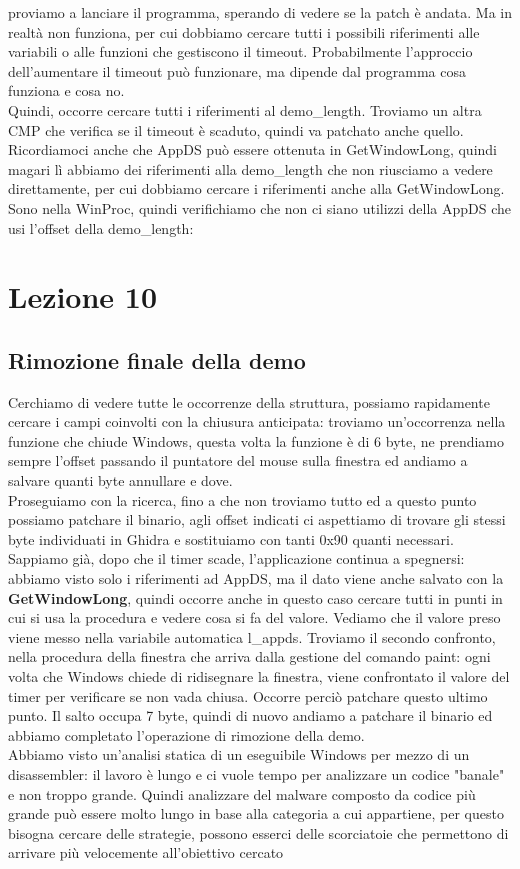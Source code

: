 \documentclass[12pt, oneside]{extbook}
\begin{document}
proviamo a lanciare il  programma, sperando di vedere se la patch è andata. Ma in realtà non funziona, per cui dobbiamo cercare tutti i possibili riferimenti alle variabili o alle funzioni che gestiscono il timeout. Probabilmente l'approccio dell'aumentare il timeout può funzionare, ma dipende dal programma cosa funziona e cosa no.\\ Quindi, occorre cercare tutti i riferimenti al \textsf{demo\_length}. Troviamo un altra CMP che verifica se il timeout è scaduto, quindi va patchato anche quello.\\ Ricordiamoci anche che AppDS può essere ottenuta in GetWindowLong, quindi magari lì abbiamo dei riferimenti alla \textsf{demo\_length} che non riusciamo a vedere direttamente, per cui dobbiamo cercare i riferimenti anche alla GetWindowLong. Sono nella WinProc, quindi verifichiamo che non ci siano utilizzi della AppDS che usi l'offset della \textsf{demo\_length}: 
\chapter{Lezione 10}
\section{Rimozione finale della demo}
Cerchiamo di vedere tutte le occorrenze della struttura, possiamo rapidamente cercare i campi coinvolti con la chiusura anticipata: troviamo un'occorrenza nella funzione che chiude Windows, questa volta la funzione è di 6 byte, ne prendiamo sempre l'offset passando il puntatore del mouse sulla finestra ed andiamo a salvare quanti byte annullare e dove.\\ Proseguiamo con la ricerca, fino a che non troviamo tutto ed a questo punto possiamo patchare il binario, agli offset indicati ci aspettiamo di trovare gli stessi byte individuati in Ghidra e sostituiamo con tanti 0x90 quanti necessari. Sappiamo già, dopo che il timer scade, l'applicazione continua a spegnersi: abbiamo visto solo i riferimenti ad AppDS, ma il dato viene anche salvato con la \textbf{GetWindowLong}, quindi occorre anche in questo caso cercare tutti in punti in cui si usa la procedura e vedere cosa si fa del valore. Vediamo che il valore preso viene messo nella variabile automatica \textsf{l\_appds}. Troviamo il secondo confronto, nella procedura della finestra che arriva dalla gestione del comando paint: ogni volta che Windows chiede di ridisegnare la finestra, viene confrontato il valore del timer per verificare se non vada chiusa. Occorre perciò patchare questo ultimo punto. Il salto occupa 7 byte, quindi di nuovo andiamo a patchare il binario ed abbiamo completato l'operazione di rimozione della demo.\\ Abbiamo visto un'analisi statica di un eseguibile Windows per mezzo di un disassembler: il lavoro è lungo e ci vuole tempo per analizzare un codice "banale" e non troppo grande. Quindi analizzare del malware composto da codice più grande può essere molto lungo in base alla categoria a cui appartiene, per questo bisogna cercare delle strategie, possono esserci delle scorciatoie che permettono di arrivare più velocemente all'obiettivo cercato
\end{document}
